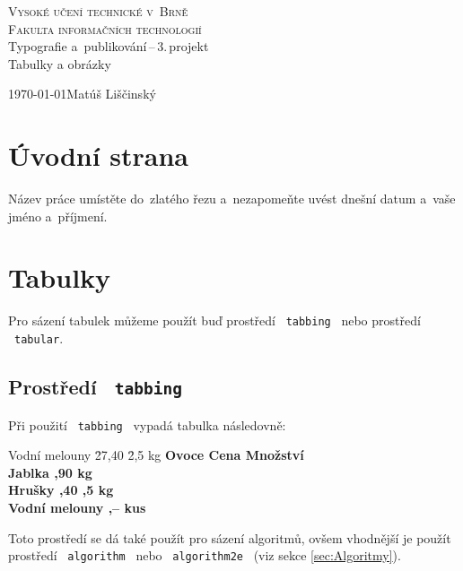 \documentclass[11pt,a4paper]{article}
\begin{document}
\begin{titlepage}
\begin{center}
{\Huge\textsc{Vysoké učení technické v~Brně}} \\
\medskip
{\huge\textsc{Fakulta informačních technologií}}	\\
{\LARGE{Typografie a~publikování\,--\,3.\,projekt}} \\ 
\medskip
{\Huge{Tabulky a obrázky}} \\
\end{center}
{\Large\today \hfill Matúš Liščinský}
\end{titlepage}

\section{Úvodní strana}
Název práce umístěte do~zlatého řezu a~nezapomeňte uvést dnešní datum a~vaše jméno a~příjmení.
\section{Tabulky}
Pro sázení tabulek můžeme použít buď prostředí \ \texttt{tabbing} \ nebo prostředí \ \texttt{tabular}.
\subsection{Prostředí \ \texttt{tabbing}}
Při použití \ \texttt{tabbing} \ vypadá tabulka následovně:
\begin{tabbing}
Vodní melouny \quad \= 27,40 \quad \= 2,5 kg \quad \kill
\bfseries Ovoce \> 
\bfseries Cena \>
\bfseries Množství \\
Jablka ,90  kg \\
Hrušky ,40 ,5 kg\\
Vodní melouny ,--  kus
\end{tabbing}
\bigskip
Toto prostředí se dá také použít pro sázení algoritmů, ovšem vhodnější je použít prostředí \ \texttt{algorithm} \ nebo \ \texttt{algorithm2e} \ (viz sekce \ref{sec:Algoritmy}).
\end{document}
